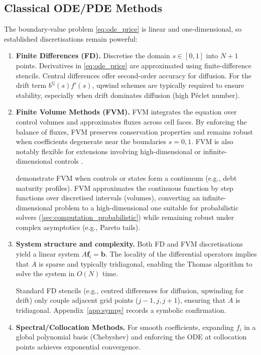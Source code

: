 ﻿\documentclass[11pt,letterpaper,oneside]{article}
\numberwithin{equation}{section}
\newcommand{\1}{\mathbf{1}}
\begin{document}
\subsection{Classical ODE/PDE Methods}\label{sec:computation_classical}
The boundary-value problem \eqref{eq:ode_price} is linear and one-dimensional, so established discretisations remain powerful:
\begin{enumerate}[leftmargin=1.25em]
  \item \textbf{Finite Differences (FD).} Discretise the domain $s\in[0,1]$ into $N+1$ points. Derivatives in \cref{eq:ode_price} are approximated using finite-difference stencils. Central differences offer second-order accuracy for diffusion. For the drift term $b^{\mathbb{Q}}(s) f'(s)$, upwind schemes are typically required to ensure stability, especially when drift dominates diffusion (high P\'eclet number).
  \item \textbf{Finite Volume Methods (FVM).} FVM integrates the equation over control volumes and approximates fluxes across cell faces. By enforcing the balance of fluxes, FVM preserves conservation properties and remains robust when coefficients degenerate near the boundaries $s=0,1$. FVM is also notably flexible for extensions involving high-dimensional or infinite-dimensional controls \cite{chen2025applications}.
  \begin{tcolorbox}[literaturestyle, title={FVM for Continuum Controls}]
  \cite{chen2025applications} demonstrate FVM when controls or states form a continuum (e.g., debt maturity profiles). FVM approximates the continuous function by step functions over discretised intervals (volumes), converting an infinite-dimensional problem to a high-dimensional one suitable for probabilistic solvers (\cref{sec:computation_probabilistic}) while remaining robust under complex asymptotics (e.g., Pareto tails).
  \end{tcolorbox}
  \item \textbf{System structure and complexity.} Both FD and FVM discretisations yield a linear system $A\bm{f}_i=\bm{b}$. The locality of the differential operators implies that $A$ is sparse and typically tridiagonal, enabling the Thomas algorithm to solve the system in $O(N)$ time.
  \begin{sympycheck}[title={Verification: Tridiagonal structure from 1D discretisation}]
  \small Standard FD stencils (e.g., centred differences for diffusion, upwinding for drift) only couple adjacent grid points ($j-1, j, j+1$), ensuring that $A$ is tridiagonal. Appendix~\ref{app:sympy} records a symbolic confirmation.
  \end{sympycheck}
  \item \textbf{Spectral/Collocation Methods.} For smooth coefficients, expanding $f_i$ in a global polynomial basis (Chebyshev) and enforcing the ODE at collocation points achieves exponential convergence.
\end{enumerate}
\end{document}
